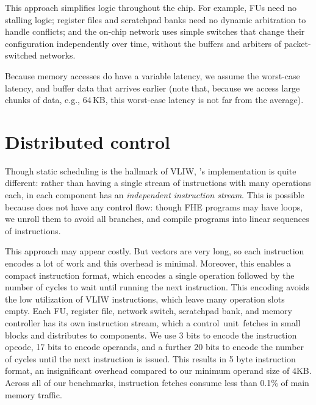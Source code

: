 This approach simplifies logic throughout the chip. For example, FUs need no stalling logic;
register files and scratchpad banks need no dynamic arbitration to handle conflicts;
and the on-chip network uses simple switches that change their configuration independently over time,
without the buffers and arbiters of packet-switched networks.

Because memory accesses do have a variable latency, we assume the worst-case latency,
and buffer data that arrives earlier %
(note that, because we access large chunks of data,
e.g., 64\,KB, this worst-case latency is not far from the average).

\section{Distributed control}
Though static scheduling is the hallmark of VLIW, \name's implementation is quite different:
rather than having a single stream of instructions with many operations each, in
\name each component has an \emph{independent instruction stream}.  %
This is possible because \name does not have any control flow: though FHE programs may have loops,
we unroll them to avoid all branches, and compile programs into linear sequences of instructions.

This approach may appear costly. But vectors are very long, so each instruction encodes a lot of work and this overhead is minimal. Moreover, this enables a compact instruction format, which encodes a single operation followed by the number of cycles
to wait until running the next instruction. 
This encoding avoids the low utilization of VLIW instructions, which leave many operation slots empty.
Each FU, register file, network switch, scratchpad bank, and memory controller has its own instruction stream,
which a control~unit~fetches in small blocks and distributes to components. 
We use 3 bits to encode the instruction opcode, 17 bits to encode operands, and a further 20 bits to encode the number of cycles until the next instruction is issued. This results in 5 byte instruction format, an insignificant overhead compared to our minimum operand size of 4KB. Across all of our benchmarks, instruction fetches consume less than 0.1\% of main memory traffic.

